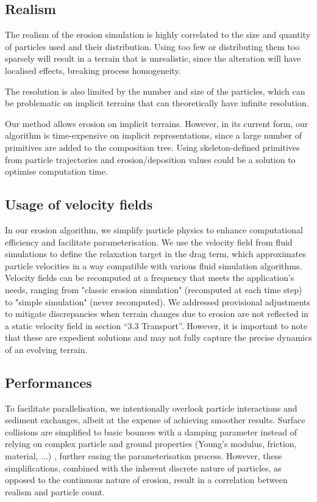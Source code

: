 \subsection{Realism}
The realism of the erosion simulation is highly correlated to the size and quantity of particles used and their distribution. Using too few or distributing them too sparsely will result in a terrain that is unrealistic, since the alteration will have localised effects, breaking process homogeneity.

The resolution is also limited by the number and size of the particles, which can be problematic on implicit terrains that can theoretically have infinite resolution.

Our method allows erosion on implicit terrains. However, in its current form, our algorithm is time-expensive on implicit representations, since a large number of primitives are added to the composition tree. Using skeleton-defined primitives \cite{Hong2013, Rigaudiere2000} from particle trajectories and erosion/deposition values could be a solution to optimise computation time.

\subsection{Usage of velocity fields}
In our erosion algorithm, we simplify particle physics to enhance computational efficiency and facilitate parameterisation. We use the velocity field from fluid simulations to define the relaxation target in the drag term, which approximates particle velocities in a way compatible with various fluid simulation algorithms. Velocity fields can be recomputed at a frequency that meets the application's needs, ranging from "classic erosion simulation" (recomputed at each time step) to "simple simulation" (never recomputed). We addressed provisional adjustments to mitigate discrepancies when terrain changes due to erosion are not reflected in a static velocity field in section “3.3 Transport”. However, it is important to note that these are expedient solutions and may not fully capture the precise dynamics of an evolving terrain.

\subsection{Performances}
To facilitate parallelisation, we intentionally overlook particle interactions and sediment exchanges, albeit at the expense of achieving smoother results. Surface collisions are simplified to basic bounces with a damping parameter instead of relying on complex particle and ground properties (Young's modulus, friction, material, ...) \cite{Yan2020}, further easing the parameterisation process. However, these simplifications, combined with the inherent discrete nature of particles, as opposed to the continuous nature of erosion, result in a correlation between realism and particle count.

